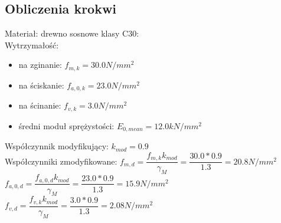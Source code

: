 \documentclass[12pt,a4paper]{article}
\begin{document}
\subsection{Obliczenia krokwi}
Materiał: drewno sosnowe klasy C30:\\
Wytrzymałość:
\begin{itemize}
	\item na zginanie: $f_{m,k}=30.0N/mm^2$
	\item na ściskanie: $f_{a,0,k} = 23.0N/mm^2$
	\item na ścinanie: $f_{v,k}=3.0N/mm^2$
	\item średni moduł sprężystości: $E_{0,mean}=12.0kN/mm^2$
\end{itemize}
Współczynnik modyfikujący: $k_{mod}=0.9$\\
Współczynniki zmodyfikowane:
$f_{m,d}=\dfrac{f_{m,k}k_{mod}}{\gamma_M}=\dfrac{30.0*0.9}{1.3}=20.8N/mm^2$\\
$f_{a,0,d}=\dfrac{f_{a,0,d}k_{mod}}{\gamma_M}=\dfrac{23.0*0.9}{1.3}=15.9N/mm^2$\\
$f_{v,d}=\dfrac{f_{v,k}k_{mod}}{\gamma_M}=\dfrac{3.0*0.9}{1.3}=2.08N/mm^2$\\
\end{document}
